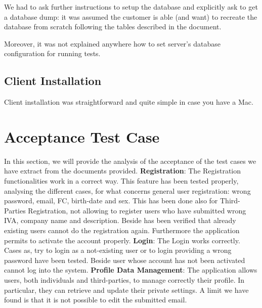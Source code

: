 \documentclass[a4paper]{article}
\begin{document}
We had to ask further instructions to setup the database and explicitly ask to get a database dump: it was assumed the customer is able (and want) to recreate the database from scratch following the tables described in the document.

Moreover, it was not explained anywhere how to set server's database configuration for running tests.
\subsection{Client Installation}
Client installation was straightforward and quite simple in case you have a Mac.

\newpage
\section{Acceptance Test Case}
In this section, we will provide the analysis of the acceptance of the test cases we have extract from the documents provided. \newline\newline
\textbf{Registration}:\newline
The Registration functionalities work in a correct way. This feature has been tested properly, analysing the different cases, for what concerns general user registration: wrong password, email, FC, birth-date and sex. This has been done also for Third-Parties Registration, not allowing to register users who have submitted wrong IVA, company name and description.\newline
Beside has been verified that already existing users cannot do the registration again. Furthermore the application permits to activate the account properly.
\newline\newline
\textbf{Login}:\newline
The Login works correctly. Cases as, try to login as a not-existing user or to login providing a wrong password have been tested. Beside user whose account has not been activated cannot log into the system.
\newline\newline
\textbf{Profile Data Management}:\newline
The application allows users, both individuals and third-parties, to manage correctly their profile. In particular, they can retrieve and update their private settings. A limit we have found is that it is not possible to edit the submitted email.
\newline\newline
\end{document}
